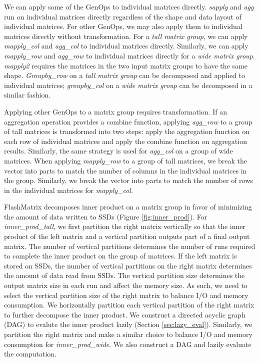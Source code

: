We can apply some of the GenOps to individual matrices directly. \textit{sapply}
and \textit{agg} run on individual matrices directly regardless of the shape
and data layout of individual matrices. For other GenOps, we may also apply
them to individual matrices directly without transformation. For a
\textit{tall matrix group}, we can apply \textit{mapply\_col} and \textit{agg\_col}
to individual matrices directly.
Similarly, we can apply \textit{mapply\_row} and \textit{agg\_row} to
individual matrices directly for a \textit{wide matrix group}. \textit{mapply2}
requires the matrices in the two input matrix groups to have the same shape.
\textit{Groupby\_row} on a \textit{tall matrix group} can be decomposed and
applied to individual matrices; \textit{groupby\_col} on a \textit{wide matrix group}
can be decomposed in a similar fashion.

Applying other GenOps to a matrix group requires transformation. If an aggregation
operation provides a combine function, applying \textit{agg\_row} to a group of
tall matrices is transformed into two steps: apply the aggregation function on
each row of individual matrices and apply the combine function on aggregation
results. Similarly, the same strategy is used for \textit{agg\_col} on a group
of wide matrices. When applying \textit{mapply\_row} to a group of tall matrices,
we break the vector into parts to match the number of columns in the individual
matrices in the group. Similarly, we break the vector into parts to match the number
of rows in the individual matrices for \textit{mapply\_col}.

FlashMatrix decomposes inner product on a matrix group in favor of minimizing
the amount of data written to SSDs (Figure \ref{fig:inner_prod}).
For \textit{inner\_prod\_tall}, we first partition the right matrix vertically
so that the inner product of the left matrix and a vertical partition outputs
part of a final output matrix. The number of vertical partitions determines
the number of runs required to complete the inner product on the group of matrices.
If the left matrix is stored on SSDs, the number of vertical partitions on
the right matrix determines the amount of data read from SSDs. The vertical
partition size determines the output matrix size in each run and affect
the memory size. As such, we need to select the vertical partition size of
the right matrix to balance I/O and memory consumption. We horizontally partition
each vertical partition of the right matrix to further decompose the inner
product. We construct a directed acyclic graph (DAG) to evalute the inner
product lazily (Section \ref{sec:lazy_eval}). Similarly, we partition the right
matrix and make a similar choice to balance I/O and memory consumption for
\textit{inner\_prod\_wide}. We also construct a DAG and lazily evaluate
the computation.

